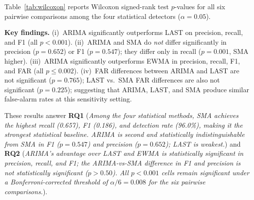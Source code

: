 \documentclass[a4paper,fleqn]{cas-sc}
\theoremstyle{plain}
\begin{document}
Table~\ref{tab:wilcoxon} reports Wilcoxon signed-rank test $p$-values for
all six pairwise comparisons among the four statistical detectors
($\alpha = 0.05$).

\begin{table}[tbp]
\centering
{}
\caption{Wilcoxon signed-rank test $p$-values ($n = 214$, calibration baseline)
  for all six pairwise comparisons among the four statistical detectors.
  Cells with $^{*}$ are \emph{not statistically significant} ($p \geq 0.05$).}
\label{tab:wilcoxon}
\end{table}

\textbf{Key findings.}
(i)~ARIMA significantly outperforms LAST on precision, recall, and F1 (all $p<0.001$).
(ii)~ARIMA and SMA do \emph{not} differ significantly in precision ($p=0.652$)
or F1 ($p=0.547$); they differ only in recall ($p=0.001$, SMA higher).
(iii)~ARIMA significantly outperforms EWMA in precision, recall, F1, and FAR (all $p \leq 0.002$).
(iv)~FAR differences between ARIMA and LAST are not significant ($p=0.765$);
LAST vs.\ SMA FAR differences are also not significant ($p=0.225$);
suggesting that ARIMA, LAST, and SMA produce similar false-alarm rates
at this sensitivity setting.

These results answer \textbf{RQ1} (\emph{Among the four statistical methods,
SMA achieves the highest recall (0.657), F1 (0.186), and detection rate (96.0\%),
making it the strongest statistical baseline.
ARIMA is second and statistically indistinguishable from SMA in F1 ($p=0.547$)
and precision ($p=0.652$); LAST is weakest.})
and \textbf{RQ2} (\emph{ARIMA's advantage over LAST and EWMA is statistically
significant in precision, recall, and F1; the ARIMA-vs-SMA difference in F1
and precision is not statistically significant ($p > 0.50$).
All $p<0.001$ cells remain significant under a Bonferroni-corrected threshold
of $\alpha/6 = 0.008$ for the six pairwise comparisons.}).
\end{document}
